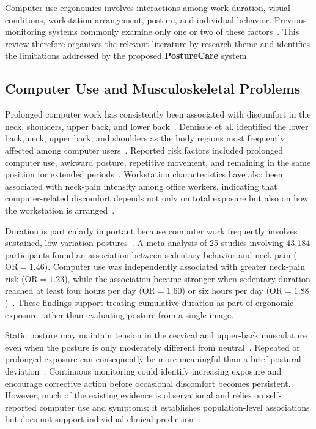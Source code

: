 

Computer-use ergonomics involves interactions among work duration, visual conditions, workstation arrangement, posture, and individual behavior. Previous monitoring systems commonly examine only one or two of these factors~\cite{ref14,ref15,ref16,ref17}. This review therefore organizes the relevant literature by research theme and identifies the limitations addressed by the proposed \textbf{PostureCare} system.

\subsection{Computer Use and Musculoskeletal Problems}
Prolonged computer work has consistently been associated with discomfort in the neck, shoulders, upper back, and lower back~\cite{ref2}. Demissie et al. identified the lower back, neck, upper back, and shoulders as the body regions most frequently affected among computer users~\cite{ref2}. Reported risk factors included prolonged computer use, awkward posture, repetitive movement, and remaining in the same position for extended periods~\cite{ref2}. Workstation characteristics have also been associated with neck-pain intensity among office workers, indicating that computer-related discomfort depends not only on total exposure but also on how the workstation is arranged~\cite{ref6}.

Duration is particularly important because computer work frequently involves sustained, low-variation postures~\cite{ref18}. A meta-analysis of 25 studies involving 43,184 participants found an association between sedentary behavior and neck pain ($\text{OR} = 1.46$). Computer use was independently associated with greater neck-pain risk ($\text{OR} = 1.23$), while the association became stronger when sedentary duration reached at least four hours per day ($\text{OR} = 1.60$) or six hours per day ($\text{OR} = 1.88$)~\cite{ref12}. These findings support treating cumulative duration as part of ergonomic exposure rather than evaluating posture from a single image.

Static posture may maintain tension in the cervical and upper-back musculature even when the posture is only moderately different from neutral~\cite{ref18}. Repeated or prolonged exposure can consequently be more meaningful than a brief postural deviation~\cite{ref2,ref12}. Continuous monitoring could identify increasing exposure and encourage corrective action before occasional discomfort becomes persistent. However, much of the existing evidence is observational and relies on self-reported computer use and symptoms; it establishes population-level associations but does not support individual clinical prediction~\cite{ref2,ref6,ref12}.


